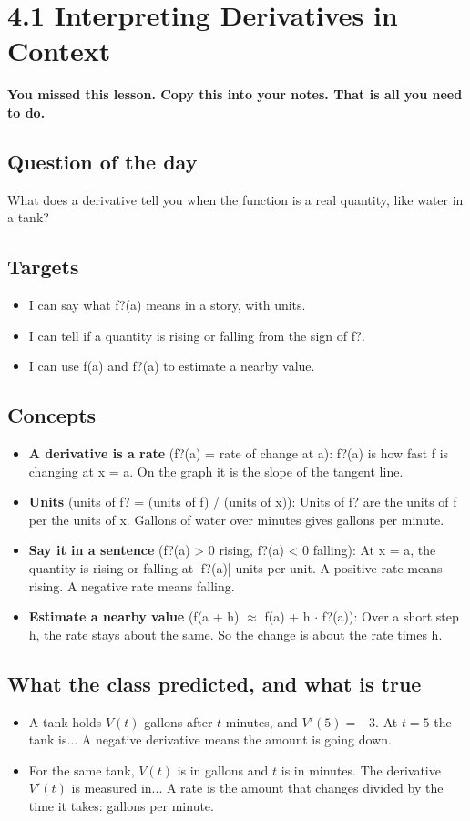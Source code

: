 \documentclass[11pt]{article}
\begin{document}
\section*{4.1 Interpreting Derivatives in Context}
\textbf{You missed this lesson. Copy this into your notes. That is all you need to do.}\par\medskip
\subsection*{Question of the day}
What does a derivative tell you when the function is a real quantity, like water in a tank?\par
\subsection*{Targets}\begin{itemize}\item I can say what f?(a) means in a story, with units.
\item I can tell if a quantity is rising or falling from the sign of f?.
\item I can use f(a) and f?(a) to estimate a nearby value.\end{itemize}
\subsection*{Concepts}\begin{itemize}
\item \textbf{A derivative is a rate} (f?(a) = rate of change at a): f?(a) is how fast f is changing at x = a. On the graph it is the slope of the tangent line.
\item \textbf{Units} (units of f? = (units of f) / (units of x)): Units of f? are the units of f per the units of x. Gallons of water over minutes gives gallons per minute.
\item \textbf{Say it in a sentence} (f?(a) > 0 rising, f?(a) < 0 falling): At x = a, the quantity is rising or falling at |f?(a)| units per unit. A positive rate means rising. A negative rate means falling.
\item \textbf{Estimate a nearby value} (f(a + h) $\approx$ f(a) + h $\cdot$ f?(a)): Over a short step h, the rate stays about the same. So the change is about the rate times h.
\end{itemize}
\subsection*{What the class predicted, and what is true}\begin{itemize}
\item A tank holds $V(t)$ gallons after $t$ minutes, and $V'(5)=-3$. At $t=5$ the tank is...  A negative derivative means the amount is going down.
\item For the same tank, $V(t)$ is in gallons and $t$ is in minutes. The derivative $V'(t)$ is measured in...  A rate is the amount that changes divided by the time it takes: gallons per minute.
\end{itemize}
\end{document}
